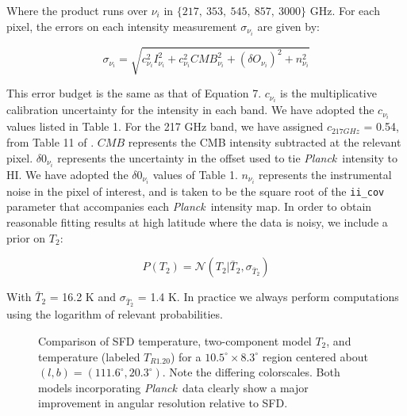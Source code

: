 \documentclass{emulateapj}
\newcommand{\PLANCK}{{\it Planck}}
\begin{document}

Where the product runs over $\nu_i$ in $\{217,\ 353,\ 545,\ 857,\ 3000\}$ GHz. 
For each pixel, the errors on each intensity measurement $\sigma_{\nu_i}$ are 
given by:

\begin{equation}
\sigma_{\nu_i} = \sqrt{c^2_{\nu_i}I^2_{\nu_i} + c^2_{\nu_i}CMB^2_{\nu_i} + (\delta O_{\nu_i})^2 + n^2_{\nu_i}}
\end{equation}

This error budget is the same as that of \cite{planckdust} Equation 7. 
$c_{\nu_i}$ is the multiplicative calibration uncertainty for the intensity in 
each band. We have adopted the $c_{\nu_i}$ values listed in \cite{planckdust} 
Table 1. For the 217 GHz band, we have assigned $c_{217 GHz}$ = 0.54, from 
Table 11 of \cite{planckcalib}. $CMB$ represents the CMB intensity 
subtracted at the relevant pixel. $\delta0_{\nu_i}$ represents the uncertainty
in the offset used to tie \PLANCK~intensity to HI. We have adopted the 
 $\delta0_{\nu_i}$ values of \cite{planckdust} Table 1. $n_{\nu_i}$ represents 
the instrumental noise in the pixel of interest, and is taken to be the square 
root of the \verb|ii_cov| parameter that accompanies each \PLANCK~intensity 
map. In order to obtain reasonable fitting results at high latitude where the 
data is noisy, we include a prior on $T_2$:


\begin{equation}
P(T_2) = \mathcal{N}(T_2|\bar{T}_2, \sigma_{\bar{T}_2})
\end{equation}

With $\bar{T}_2$ = 16.2 K and $\sigma_{\bar{T}_2}$ = 1.4 K. In practice we 
always perform computations using the logarithm of relevant probabilities.

\begin{figure}
\begin{center}
\caption{\label{fig:comparison} Comparison of SFD temperature, two-component 
model $T_2$, and \cite{planckdust} temperature (labeled $T_{R1.20}$) for a
 $10.5^{\circ}\times8.3^{\circ}$  region centered about 
$(l,b) = (111.6^{\circ}, 20.3^{\circ})$. Note the 
differing colorscales. Both models incorporating \PLANCK~data clearly show a 
major improvement in angular resolution relative to SFD.}
\end{center}
\end{figure}
\end{document}
